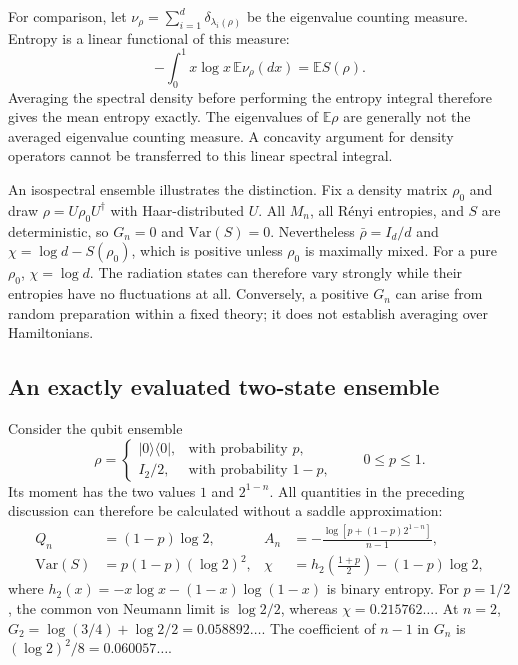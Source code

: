 \documentclass[11pt,letterpaper]{article}
\theoremstyle{plain}
\theoremstyle{definition}
\theoremstyle{remark}
\newcommand{\E}{\mathbb{E}}
\newcommand{\Var}{\text{Var}}
\begin{document}
For comparison, let $\nu_\rho=\sum_{i=1}^d\delta_{\lambda_i(\rho)}$
be the eigenvalue counting measure.  Entropy is a linear functional of
this measure:
\begin{equation}
 -\int_0^1 x\log x\,\E\nu_\rho(dx)=\E S(\rho).
 \label{eq06:averaged_spectral_density}
\end{equation}
Averaging the spectral density before performing the entropy integral
therefore gives the mean entropy exactly.  The eigenvalues of
$\E\rho$ are generally not the averaged eigenvalue counting measure.
A concavity argument for density operators cannot be transferred to
this linear spectral integral.

An isospectral ensemble illustrates the distinction.  Fix a density
matrix $\rho_0$ and draw $\rho=U\rho_0U^\dagger$ with Haar-distributed
$U$.  All $M_n$, all R\'enyi entropies, and $S$ are deterministic, so
$G_n=0$ and $\Var(S)=0$.  Nevertheless $\bar\rho=I_d/d$ and
$\chi=\log d-S(\rho_0)$, which is positive unless $\rho_0$ is maximally
mixed.  For a pure $\rho_0$, $\chi=\log d$.  The radiation states can
therefore vary strongly while their entropies have no fluctuations at
all.  Conversely, a positive $G_n$ can arise from random preparation
within a fixed theory; it does not establish averaging over Hamiltonians.

\subsection{An exactly evaluated two-state ensemble}
\label{subsec06:two_state_example}

Consider the qubit ensemble
\begin{equation}
 \rho=\begin{cases}
 |0\rangle\langle0|,&\text{with probability }p,\\
 I_2/2,&\text{with probability }1-p,
 \end{cases}
 \qquad 0\leq p\leq1.
 \label{eq06:two_state_ensemble}
\end{equation}
Its moment has the two values $1$ and $2^{1-n}$.  All quantities in the
preceding discussion can therefore be calculated without a saddle
approximation:
\begin{align}
 Q_n&=(1-p)\log2,
 & A_n&=-\frac{\log[p+(1-p)2^{1-n}]}{n-1},
 \label{eq06:two_state_renyi}\\
 \Var(S)&=p(1-p)(\log2)^2,
 & \chi&=h_2\!\left(\frac{1+p}{2}\right)-(1-p)\log2,
 \label{eq06:two_state_variance}
\end{align}
where $h_2(x)=-x\log x-(1-x)\log(1-x)$ is binary entropy.
For $p=1/2$, the common von Neumann limit is $\log2/2$, whereas
$\chi=0.215762\ldots$.  At $n=2$,
$G_2=\log(3/4)+\log2/2=0.058892\ldots$.  The coefficient of $n-1$
in $G_n$ is $(\log2)^2/8=0.060057\ldots$.
\end{document}
